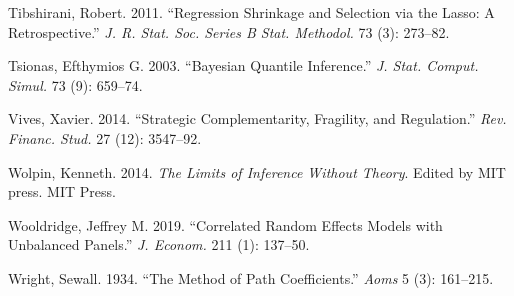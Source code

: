 \documentclass[
  10pt,
]{article}
\begin{document}
\leavevmode\hypertarget{ref-Tibshirani2011}{}%
Tibshirani, Robert. 2011. ``Regression Shrinkage and Selection via the
Lasso: A Retrospective.'' \emph{J. R. Stat. Soc. Series B Stat.
Methodol.} 73 (3): 273--82.

\leavevmode\hypertarget{ref-Tsionas2003}{}%
Tsionas, Efthymios G. 2003. ``Bayesian Quantile Inference.'' \emph{J.
Stat. Comput. Simul.} 73 (9): 659--74.

\leavevmode\hypertarget{ref-Vives2014}{}%
Vives, Xavier. 2014. ``Strategic Complementarity, Fragility, and
Regulation.'' \emph{Rev. Financ. Stud.} 27 (12): 3547--92.

\leavevmode\hypertarget{ref-Wolpin2014}{}%
Wolpin, Kenneth. 2014. \emph{The Limits of Inference Without Theory}.
Edited by MIT press. MIT Press.

\leavevmode\hypertarget{ref-Wooldridge2019}{}%
Wooldridge, Jeffrey M. 2019. ``Correlated Random Effects Models with
Unbalanced Panels.'' \emph{J. Econom.} 211 (1): 137--50.

\leavevmode\hypertarget{ref-Wright1934}{}%
Wright, Sewall. 1934. ``The Method of Path Coefficients.'' \emph{Aoms} 5
(3): 161--215.
\end{document}
